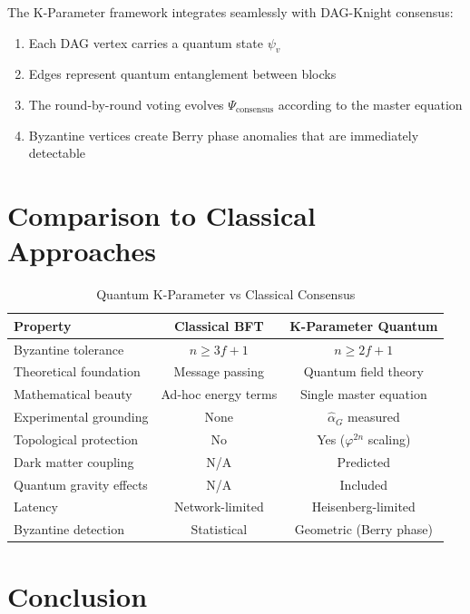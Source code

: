 \documentclass[11pt,a4paper,twoside]{article}
\begin{document}
The K-Parameter framework integrates seamlessly with DAG-Knight consensus:

\begin{enumerate}
    \item Each DAG vertex carries a quantum state $\psi_v$
    \item Edges represent quantum entanglement between blocks
    \item The round-by-round voting evolves $\Psi_{\text{consensus}}$ according to the master equation
    \item Byzantine vertices create Berry phase anomalies that are immediately detectable
\end{enumerate}

\newpage

\section{Comparison to Classical Approaches}

\begin{table}[h]
\centering
\caption{Quantum K-Parameter vs Classical Consensus}
\begin{tabular}{lcc}
\toprule
\textbf{Property} & \textbf{Classical BFT} & \textbf{K-Parameter Quantum} \\
\midrule
Byzantine tolerance & $n \geq 3f + 1$ & $n \geq 2f + 1$ \\
Theoretical foundation & Message passing & Quantum field theory \\
Mathematical beauty & Ad-hoc energy terms & Single master equation \\
Experimental grounding & None & $\hat{\alpha}_G$ measured \\
Topological protection & No & Yes ($\varphi^{2n}$ scaling) \\
Dark matter coupling & N/A & Predicted \\
Quantum gravity effects & N/A & Included \\
Latency & Network-limited & Heisenberg-limited \\
Byzantine detection & Statistical & Geometric (Berry phase) \\
\bottomrule
\end{tabular}
\end{table}

\section{Conclusion}
\end{document}
